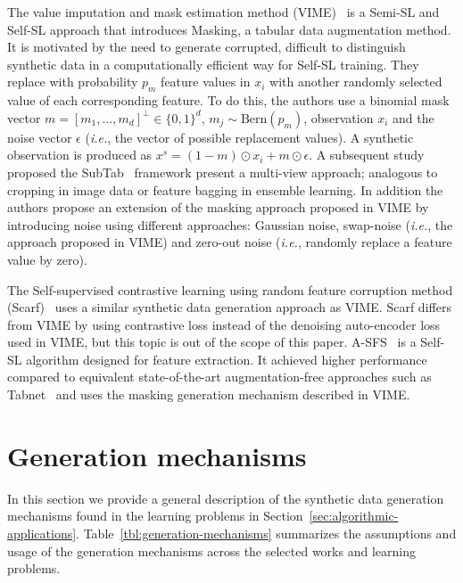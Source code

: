 \documentclass[parskip=full]{scrartcl}
\begin{document}
The value imputation and mask estimation method (VIME)~\cite{yoon2020vime} is
a Semi-SL and Self-SL approach that introduces Masking, a tabular data
augmentation method. It is motivated by the need to generate corrupted,
difficult to distinguish synthetic data in a computationally efficient way for
Self-SL training. They replace with probability $p_m$ feature values in $x_i$
with another randomly selected value of each corresponding feature. To do
this, the authors use a binomial mask vector $m=[m_1, \ldots, m_d]^\bot \in
\{0,1\}^d$, $m_j \sim \text{Bern}(p_m)$, observation $x_i$ and the noise vector
$\epsilon$ (\textit{i.e.}, the vector of possible replacement values). A
synthetic observation is produced as $x^s=(1-m) \odot x_i + m \odot \epsilon$.
A subsequent study proposed the SubTab~\cite{ucar2021subtab} framework present
a multi-view approach; analogous to cropping in image data or feature bagging
in ensemble learning. In addition the authors propose an extension of the
masking approach proposed in VIME by introducing noise using different
approaches: Gaussian noise, swap-noise (\textit{i.e.}, the approach proposed
in VIME) and zero-out noise (\textit{i.e.}, randomly replace a feature value
by zero).

The Self-supervised contrastive learning using random feature corruption
method (Scarf)~\cite{bahri2022scarf} uses a similar synthetic data generation
approach as VIME. Scarf differs from VIME by using contrastive loss instead of
the denoising auto-encoder loss used in VIME, but this topic is out of the
scope of this paper.  A-SFS~\cite{qiu2022sfs} is a Self-SL algorithm designed
for feature extraction. It achieved higher performance compared to equivalent
state-of-the-art augmentation-free approaches such as
Tabnet~\cite{arik2021tabnet} and uses the masking generation mechanism
described in VIME.



\section{Generation mechanisms}

In this section we provide a general description of the synthetic data
generation mechanisms found in the learning problems in
Section~\ref{sec:algorithmic-applications}.
Table~\ref{tbl:generation-mechanisms} summarizes the assumptions and
usage of the generation mechanisms across the selected works and learning
problems.
\end{document}

